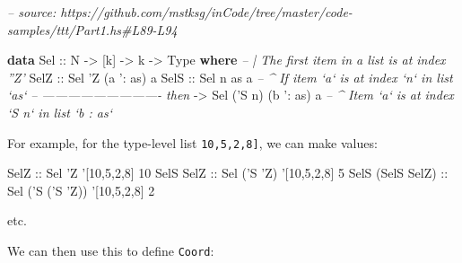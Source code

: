 \documentclass[]{article}
\newenvironment{Shaded}{}{}
\newcommand{\CommentTok}[1]{\textcolor[rgb]{0.38,0.63,0.69}{\textit{#1}}}
\newcommand{\DataTypeTok}[1]{\textcolor[rgb]{0.56,0.13,0.00}{#1}}
\newcommand{\DecValTok}[1]{\textcolor[rgb]{0.25,0.63,0.44}{#1}}
\newcommand{\FunctionTok}[1]{\textcolor[rgb]{0.02,0.16,0.49}{#1}}
\newcommand{\KeywordTok}[1]{\textcolor[rgb]{0.00,0.44,0.13}{\textbf{#1}}}
\newcommand{\NormalTok}[1]{#1}
\newcommand{\OtherTok}[1]{\textcolor[rgb]{0.00,0.44,0.13}{#1}}
\begin{document}
\begin{Shaded}
\begin{Highlighting}[]
\CommentTok{-- source: https://github.com/mstksg/inCode/tree/master/code-samples/ttt/Part1.hs#L89-L94}

\KeywordTok{data} \DataTypeTok{Sel}\OtherTok{ ::} \DataTypeTok{N} \OtherTok{->}\NormalTok{ [k] }\OtherTok{->}\NormalTok{ k }\OtherTok{->} \DataTypeTok{Type} \KeywordTok{where}
    \CommentTok{-- | The first item in a list is at index ''Z'}
    \DataTypeTok{SelZ}\OtherTok{ ::} \DataTypeTok{Sel}\NormalTok{ '}\DataTypeTok{Z}\NormalTok{ (a '}\FunctionTok{:}\NormalTok{ as) a}
    \DataTypeTok{SelS}\OtherTok{ ::} \DataTypeTok{Sel}\NormalTok{     n        as  a  }\CommentTok{-- ^ If item `a` is at index `n` in list `as`}
         \CommentTok{-- ---------------------------- then}
         \OtherTok{->} \DataTypeTok{Sel}\NormalTok{ ('}\DataTypeTok{S}\NormalTok{ n) (b '}\FunctionTok{:}\NormalTok{ as) a  }\CommentTok{-- ^ Item `a` is at index `S n` in list `b : as`}
\end{Highlighting}
\end{Shaded}

For example, for the type-level list \texttt{\textquotesingle{}{[}10,5,2,8{]}},
we can make values:

\begin{Shaded}
\begin{Highlighting}[]
\DataTypeTok{SelZ}\OtherTok{             ::} \DataTypeTok{Sel}\NormalTok{         '}\DataTypeTok{Z}\NormalTok{   '[}\DecValTok{10}\NormalTok{,}\DecValTok{5}\NormalTok{,}\DecValTok{2}\NormalTok{,}\DecValTok{8}\NormalTok{] }\DecValTok{10}
\DataTypeTok{SelS} \DataTypeTok{SelZ}\OtherTok{        ::} \DataTypeTok{Sel}\NormalTok{     ('}\DataTypeTok{S}\NormalTok{ '}\DataTypeTok{Z}\NormalTok{)  '[}\DecValTok{10}\NormalTok{,}\DecValTok{5}\NormalTok{,}\DecValTok{2}\NormalTok{,}\DecValTok{8}\NormalTok{] }\DecValTok{5}
\DataTypeTok{SelS}\NormalTok{ (}\DataTypeTok{SelS} \DataTypeTok{SelZ}\NormalTok{)}\OtherTok{ ::} \DataTypeTok{Sel}\NormalTok{ ('}\DataTypeTok{S}\NormalTok{ ('}\DataTypeTok{S}\NormalTok{ '}\DataTypeTok{Z}\NormalTok{)) '[}\DecValTok{10}\NormalTok{,}\DecValTok{5}\NormalTok{,}\DecValTok{2}\NormalTok{,}\DecValTok{8}\NormalTok{] }\DecValTok{2}
\end{Highlighting}
\end{Shaded}

etc.

We can then use this to define \texttt{Coord}:
\end{document}
